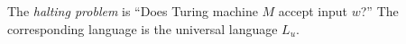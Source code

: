 

\setcounter{section}{8}
\setcounter{subsection}{5}
\setcounter{dfn}{7}

The \emph{halting problem} is ``Does Turing machine $M$ accept input $w$?''
The corresponding language is the universal language $L_u$.



